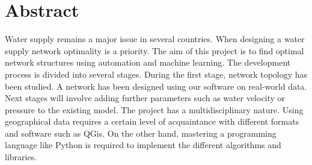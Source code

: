 \newpage
\chapter*{Abstract}


Water supply remains a major issue in several countries. When designing a water supply
network optimality is a priority. The aim of this project is to find optimal network
structures using automation and machine learning.
The development process is divided into several stages. During the first stage, network
topology has been studied. A network has been designed using our software on real-world
data.\bigbreak
\noindent Next stages will involve adding further parameters such as water velocity or 
pressure to the existing model. The project has a multidisciplinary nature. Using geographical 
data requires a certain level of acquaintance with different formats and software such as QGis. 
On the other hand, mastering a programming language like Python is required to implement the different
 algorithms and libraries.